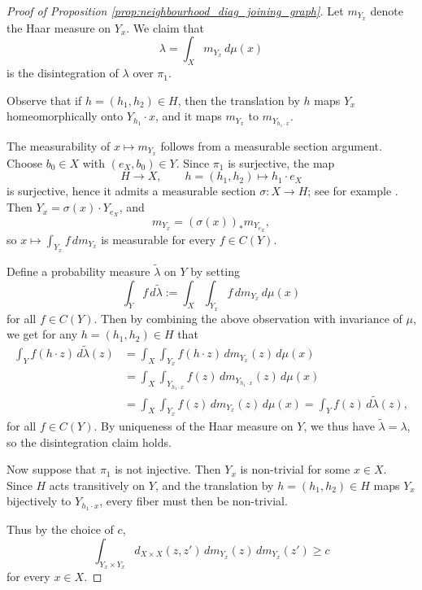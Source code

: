\documentclass[12pt]{amsart}
\theoremstyle{plain}
\theoremstyle{definition}
\begin{document}
\begin{proof}[Proof of Proposition \ref{prop:neighbourhood_diag_joining_graph}]
    Let $m_{Y_x}$ denote the Haar measure on $Y_x$.
    We claim that 
    \[
    \lambda = \int_X m_{Y_x} \,d \mu(x)
    \] 
    is the disintegration of $\lambda$ over $\pi_1$.

    Observe that if $h = (h_1, h_2) \in H$, then the translation by $h$ maps $Y_x$ homeomorphically onto $Y_{h_1} \cdot x$, and it maps $m_{Y_x}$ to $m_{Y_{h_1 \cdot x}}$.

    The measurability of $x \mapsto m_{Y_x}$ follows from a measurable section argument. 
    Choose $b_0 \in X$ with $(e_X, b_0) \in Y$. 
    Since $\pi_1$ is surjective, the map 
    \[
    H \to X, \qquad h = (h_1, h_2) \mapsto h_1 \cdot e_X
    \]
    is surjective, hence it admits a measurable section $\sigma \colon X \to H$; see for example \cite[Lemma~7]{baggett1980functional}.
    Then $Y_x = \sigma(x) \cdot Y_{e_X}$, and  
    \[
    m_{Y_x} = (\sigma(x))_* m_{Y_{e_X}},
    \]
    so $x \mapsto \int_{Y_x} f \,d m_{Y_x}$ is measurable for every $f \in C(Y)$.
    
    
    Define a probability measure $\widetilde{\lambda}$ on $Y$ by setting
    \[
    \int_Y f \,d\widetilde{\lambda} 
    := \int_X \int_{Y_x} f \,d m_{Y_x} \,d\mu(x)
    \]
    for all $f \in C(Y)$.
    Then by combining the above observation with invariance of $\mu$, we get for any $h = (h_1, h_2) \in H$ that  
    \begin{align*}
        \int_Y f(h \cdot z) \,d\widetilde{\lambda}(z)
        &= \int_X \int_{Y_x} f(h \cdot z) \,d m_{Y_x}(z) \,d\mu(x) \\
        &= \int_X \int_{Y_{h_1 \cdot x}} f(z) \,d m_{Y_{h_1 \cdot x}}(z) \,d\mu(x) \\
        &= \int_X \int_{Y_x} f(z) \,d m_{Y_x}(z) \,d\mu(x) 
        = \int_Y f(z) \,d\widetilde{\lambda}(z),
    \end{align*}
    for all $f \in C(Y)$.
    By uniqueness of the Haar measure on $Y$, we thus have $\widetilde{\lambda} = \lambda$, so the disintegration claim holds.
    
    Now suppose that $\pi_1$ is not injective.
    Then $Y_x$ is non-trivial for some $x \in X$.
    Since $H$ acts transitively on $Y$, and the translation by $h = (h_1, h_2) \in H$ maps $Y_x$ bijectively to $Y_{h_1 \cdot x}$, every fiber must then be non-trivial.  

    Thus by the choice of $c$, 
    \[
    \int_{Y_x \times Y_x} d_{X \times X}(z, z') \,d m_{Y_x}(z) \,d m_{Y_x}(z') \geq c
    \]
    for every $x \in X$.


\end{proof}
\end{document}
